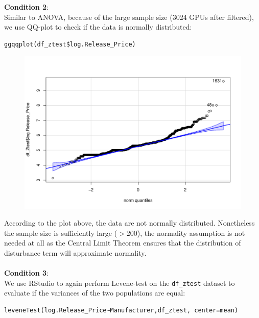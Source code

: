 \documentclass[a4paper]{article}
\begin{document}
\textbf{Condition 2}:\\
Similar to ANOVA, because of the large sample size (3024 GPUs after filtered), we use QQ-plot to check if the data is normally distributed:\\
\begin{mdframed}[leftline=false,rightline=false,backgroundcolor=lightblue!10,nobreak=false]
    \begin{verbatim}
ggqqplot(df_ztest$log.Release_Price)
    \end{verbatim}
\end{mdframed}
\begin{figure}[H]
    \centering
    \includegraphics[keepaspectratio, width=1\textwidth, height=1\textheight]{Hypothesis/Z-Test/Ztest-QQPlot.pdf}
\end{figure}
According to the plot above, the data are not normally distributed. Nonetheless the sample size is sufficiently large ($>200$), the normality assumption is not needed at all as the Central Limit Theorem ensures that the distribution of disturbance term will approximate normality. \\\\
\textbf{Condition 3}:\\
We use RStudio to again perform Levene-test on the \verb|df_ztest| dataset to evaluate if the variances of the two populations are equal:
\begin{mdframed}[leftline=false,rightline=false,backgroundcolor=lightblue!10,nobreak=false]
    \begin{verbatim}
leveneTest(log.Release_Price~Manufacturer,df_ztest, center=mean)
    \end{verbatim}
\end{mdframed}
\end{document}
